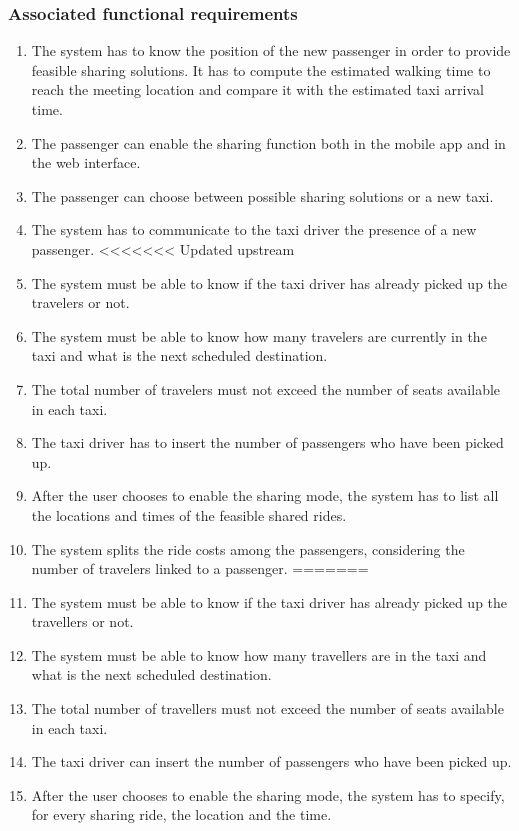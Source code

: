 \subsubsection{Associated functional requirements}
\begin{enumerate}
	\item The system has to know the position of the new passenger in order to provide feasible sharing solutions.
	It has to compute the estimated walking time to reach the meeting location and compare it with the estimated taxi arrival time.
	\item The passenger can enable the sharing function both in the mobile app and in the web interface.
	\item The passenger can choose between possible sharing solutions or a new taxi.
	\item The system has to communicate to the taxi driver the presence of a new passenger.
<<<<<<< Updated upstream
	\item The system must be able to know if the taxi driver has already picked up the travelers or not.
	\item The system must be able to know how many travelers are currently in the taxi and what is the next scheduled destination.
	\item The total number of travelers must not exceed the number of seats available in each taxi.
	\item The taxi driver has to insert the number of passengers who have been picked up.
	\item After the user chooses to enable the sharing mode, the system has to list all the locations and times of the feasible shared rides.
	\item The system splits the ride costs among the passengers, considering the number of travelers linked to a passenger.
=======
	\item The system must be able to know if the taxi driver has already picked up the travellers or not.
	\item The system must be able to know how many travellers are in the taxi and what is the next scheduled destination.
	\item The total number of travellers must not exceed the number of seats available in each taxi.
	\item The taxi driver can insert the number of passengers who have been picked up.
	\item After the user chooses to enable the sharing mode, the system has to specify, for every sharing ride, the location and the time.

\end{enumerate}
